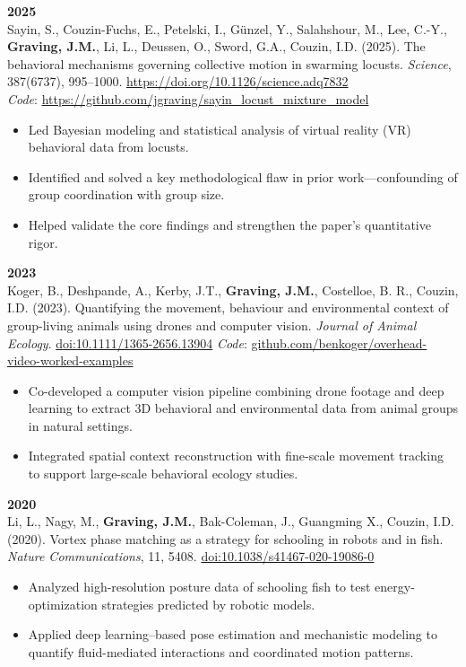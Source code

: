 \documentclass[10pt,a4paper]{article}
\begin{document}
	\vspace{4pt}
	\textbf{2025}\\
	Sayin, S., Couzin-Fuchs, E., Petelski, I., G\"unzel, Y., Salahshour, M., Lee, C.-Y., \textbf{Graving, J.M.}, Li, L., Deussen, O., Sword, G.A., Couzin, I.D. (2025). The behavioral mechanisms governing collective motion in swarming locusts. \textit{Science}, 387(6737), 995–1000. \href{https://doi.org/10.1126/science.adq7832}{https://doi.org/10.1126/science.adq7832} \\ \textit{Code}: \href{https://github.com/jgraving/sayin_locust_mixture_model}{https://github.com/jgraving/sayin\_locust\_mixture\_model}
	\begin{itemize}
		\item Led Bayesian modeling and statistical analysis of virtual reality (VR) behavioral data from locusts.
		\item Identified and solved a key methodological flaw in prior work—confounding of group coordination with group size.
		\item Helped validate the core findings and strengthen the paper's quantitative rigor.
	\end{itemize}
	
	\vspace{4pt}
	\textbf{2023}\\
	Koger, B., Deshpande, A., Kerby, J.T., \textbf{Graving, J.M.}, Costelloe, B. R., Couzin, I.D. (2023). Quantifying the movement, behaviour and environmental context of group-living animals using drones and computer vision. \textit{Journal of Animal Ecology}. \href{https://doi.org/10.1111/1365-2656.13904}{doi:10.1111/1365-2656.13904} \textit{Code}: \href{https://github.com/benkoger/overhead-video-worked-examples}{github.com/benkoger/overhead-video-worked-examples}
	\begin{itemize}
		\item Co-developed a computer vision pipeline combining drone footage and deep learning to extract 3D behavioral and environmental data from animal groups in natural settings.
		\item Integrated spatial context reconstruction with fine-scale movement tracking to support large-scale behavioral ecology studies.
	\end{itemize}
	\newpage
	\vspace{4pt}
	\textbf{2020}\\
	Li, L., Nagy, M., \textbf{Graving, J.M.}, Bak-Coleman, J., Guangming X., Couzin, I.D. (2020). Vortex phase matching as a strategy for schooling in robots and in fish. \textit{Nature Communications}, 11, 5408. \href{https://doi.org/10.1038/s41467-020-19086-0}{doi:10.1038/s41467-020-19086-0}
	\begin{itemize}
		\item Analyzed high-resolution posture data of schooling fish to test energy-optimization strategies predicted by robotic models.
		\item Applied deep learning–based pose estimation and mechanistic modeling to quantify fluid-mediated interactions and coordinated motion patterns.
	\end{itemize}
	
\end{document}
